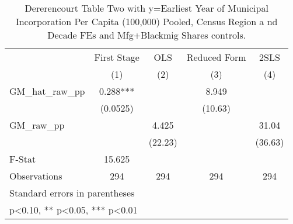 \begin{table}[htbp]\centering
\def\sym#1{\ifmmode^{#1}\else\(^{#1}\)\fi}
\caption{Dererencourt Table Two with y=Earliest Year of Municipal Incorporation Per Capita (100,000) Pooled, Census Region a nd Decade FEs and Mfg+Blackmig Shares controls.}
\begin{tabular}{l*{4}{c}}
\toprule
                    & First Stage   &         OLS   &Reduced Form   &        2SLS   \\
                    &\multicolumn{1}{c}{(1)}   &\multicolumn{1}{c}{(2)}   &\multicolumn{1}{c}{(3)}   &\multicolumn{1}{c}{(4)}   \\
\midrule
GM\_hat\_raw\_pp       &       0.288***&               &       8.949   &               \\
                    &    (0.0525)   &               &     (10.63)   &               \\
\addlinespace
GM\_raw\_pp           &               &       4.425   &               &       31.04   \\
                    &               &     (22.23)   &               &     (36.63)   \\
\midrule
F-Stat              &      15.625   &               &               &               \\
Observations        &         294   &         294   &         294   &         294   \\
\bottomrule
\multicolumn{5}{l}{\footnotesize Standard errors in parentheses}\\
\multicolumn{5}{l}{\footnotesize * p<0.10, ** p<0.05, *** p<0.01}\\
\end{tabular}
\end{table}
